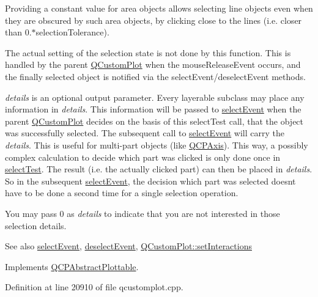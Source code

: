 Providing a constant value for area objects allows selecting line objects even when they are obscured by such area objects, by clicking close to the lines (i.\+e. closer than 0.$\ast$selection\+Tolerance).

The actual setting of the selection state is not done by this function. This is handled by the parent \hyperlink{class_q_custom_plot}{Q\+Custom\+Plot} when the mouse\+Release\+Event occurs, and the finally selected object is notified via the select\+Event/deselect\+Event methods.

{\itshape details} is an optional output parameter. Every layerable subclass may place any information in {\itshape details}. This information will be passed to \hyperlink{class_q_c_p_abstract_plottable_a16aaad02456aa23a759efd1ac90c79bf}{select\+Event} when the parent \hyperlink{class_q_custom_plot}{Q\+Custom\+Plot} decides on the basis of this select\+Test call, that the object was successfully selected. The subsequent call to \hyperlink{class_q_c_p_abstract_plottable_a16aaad02456aa23a759efd1ac90c79bf}{select\+Event} will carry the {\itshape details}. This is useful for multi-\/part objects (like \hyperlink{class_q_c_p_axis}{Q\+C\+P\+Axis}). This way, a possibly complex calculation to decide which part was clicked is only done once in \hyperlink{class_q_c_p_bars_a0d37a9feb1d0baf73ce6e809db214445}{select\+Test}. The result (i.\+e. the actually clicked part) can then be placed in {\itshape details}. So in the subsequent \hyperlink{class_q_c_p_abstract_plottable_a16aaad02456aa23a759efd1ac90c79bf}{select\+Event}, the decision which part was selected doesn\textquotesingle{}t have to be done a second time for a single selection operation.

You may pass 0 as {\itshape details} to indicate that you are not interested in those selection details.

\begin{DoxySeeAlso}{See also}
\hyperlink{class_q_c_p_abstract_plottable_a16aaad02456aa23a759efd1ac90c79bf}{select\+Event}, \hyperlink{class_q_c_p_abstract_plottable_a6fa0d0f95560ea8b01ee13f296dab2b1}{deselect\+Event}, \hyperlink{class_q_custom_plot_a5ee1e2f6ae27419deca53e75907c27e5}{Q\+Custom\+Plot\+::set\+Interactions} 
\end{DoxySeeAlso}


Implements \hyperlink{class_q_c_p_abstract_plottable_a38efe9641d972992a3d44204bc80ec1d}{Q\+C\+P\+Abstract\+Plottable}.



Definition at line 20910 of file qcustomplot.\+cpp.



